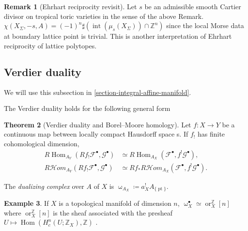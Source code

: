 \documentclass[a4paper,dvipdfmx,reqno,12pt]{amsart}
\theoremstyle{definition}
\newtheorem{theorem}{Theorem}[section]
\newtheorem{example}[theorem]{Example}
\newtheorem{remark}[theorem]{Remark}
\newcommand{\deq}{\coloneqq}
\newcommand{\Z}{\mathbb{Z}}%
\newcommand{\mcal}[1]{\mathcal{#1}}%
\newcommand{\opn}[1]{\operatorname{#1}}
\numberwithin{equation}{section}
\begin{document}
\begin{remark}[{Ehrhart reciprocity revisit}]
Let $s$ be an admissible smooth Cartier divisor on 
tropical toric varieties in the sense of the above Remark.
$\chi(X_{\Sigma},-s,A)=(-1)^{n}\sharp (\opn{int}(\mu_s(X_{\Sigma}))\cap \Z^{n})$ since
the local Morse data at boundary lattice point is trivial.
This is another interpretation of Ehrhart reciprocity of 
lattice polytopes.
\end{remark}




\iffalse
From definition,
\begin{align}
df(x)\notin \opn{Lin}(S,x)^{\bot} 
\Rightleftarrows df|_{\opn{Lin}(S,x)}(x)\ne 0
\end{align}

Fix a polyhedral fan structure $\mathscr{P}$ of 
$S/\opn{Lin}(S,x)$. The pullback induced from
$\opn{pr}\colon S\to S/\opn{Lin}(S,x)$ induces 
a fan structure on
$\bigcup_{x\in sigma \in \mathscr{P}}\sigma=
\opn{Lin}(S,x)$.

\fi
\subsection{Verdier duality}
We will use this subsection 
in \cref{section-integral-affine-manifold}.

The Verdier duality holds for the following general form
\cite[Proposition 3.1.10]{MR1299726}


\begin{theorem}[{Verdier duality and 
Borel--Moore homology}]
Let $f\colon X\to Y$ be a continuous map between locally 
compact Hausdorff space s. If $f_!$ has finite cohomological
dimension, 
\begin{align}
R\opn{Hom}_{A_Y}(R f_!\mcal{F}^{\bullet},\mcal{G}^{\bullet})    & \simeq R\opn{Hom}_{A_X}(\mcal{F}^{\bullet},f^{!}\mcal{G}^{\bullet}),        \\
R \mcal{H}om_{A_Y}(R f_! \mcal{F}^{\bullet},\mcal{G}^{\bullet}) & \simeq Rf_* R\mcal{H}om_{A_X}(\mcal{F}^{\bullet},f^{!}\mcal{G}^{\bullet}).
\end{align}
\end{theorem}



The \emph{dualizing complex} over $A$ of $X$ is 
$\upomega_{A_X}\deq a^{!}_{X}A_{\{\opn{pt}\}}$.

\begin{example}
If $X$ is a topological manifold of dimension $n$, 
$\upomega^{\bullet}_{X}\simeq \opn{or}_{X}^{\Z}[n]$ 
where $\opn{or}_{X}^{\mathbb{Z}}[n]$ is the sheaf 
associated with the presheaf $U\mapsto 
\opn{Hom}(H^{n}_c(U;\mathbb{Z}_{X}),\mathbb{Z})$
\cite[Proposition 3.3.6]{MR1299726}.
\end{example}
\end{document}
